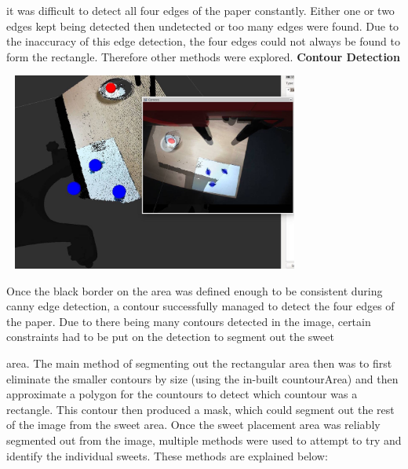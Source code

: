 it was difficult to detect all four edges of the paper constantly. Either one or two edges kept being detected then undetected or too many edges were found. Due to the inaccuracy of this edge detection, the four edges could not always be found to form the rectangle. Therefore other methods were explored.
\newline
\newline
\textbf{Contour Detection}
\newline
\begin{minipage}[t]{0.64\textwidth}
\smallskip
\centering
\includegraphics[width = 10cm, height = 6.5cm]{sweettransformation.jpg}
\centering
{}
\bigskip
\end{minipage}
\hspace{0.5cm}
\begin{minipage}[t]{0.29\textwidth}
\raggedright
Once the black border on the area was defined enough to be consistent during canny edge detection, a contour successfully managed to detect the four edges of the paper. Due to there being many contours detected in the image, certain constraints had to be put on the detection to segment out the sweet 
\end{minipage}	
area. The main method of segmenting out the rectangular area then was to first eliminate the smaller contours by size (using the in-built countourArea) and then approximate a polygon for the countours to detect which countour was a rectangle. This contour then produced a mask, which could segment out the rest of the image from the sweet area.
\newline
\newline
Once the sweet placement area was reliably segmented out from the image, multiple methods were used to attempt to try and identify the individual sweets. These methods are explained below:
\newline
